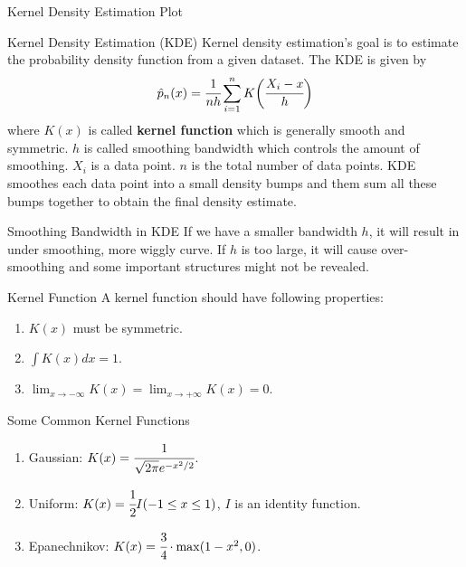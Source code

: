\documentclass[aspectratio=169,xcolor=dvipsnames,svgnames,x11names,fleqn]{beamer}
\begin{document}
\begin{frame}[allowframebreaks]{Kernel Density Estimation Plot}
\begin{facts}{Kernel Density Estimation (KDE)}
Kernel density estimation's goal is to estimate the probability density function from a given dataset. The KDE is given by 
\begin{equation}
    {\hat p}_n(x) = \cfrac{1}{nh}\sum_{i=1}^n K\bigg( \cfrac{X_i - x} {h}\bigg)
\end{equation}
    where $K(x)$ is called \textbf{kernel function} which is generally smooth and symmetric. $h$ is called smoothing bandwidth which controls the amount of smoothing. $X_i$ is a data point. $n$ is the total number of data points. KDE smoothes each data point into a small density bumps and them sum all these bumps together to obtain the final density estimate.
\end{facts}

\begin{gradblock}{Smoothing Bandwidth in KDE}
    If we have a smaller bandwidth $h$, it will result in under smoothing, more wiggly curve. If $h$ is too large, it will cause over-smoothing and some important structures might not be revealed.
\end{gradblock}

    
\begin{gradbox}{Kernel Function}
     A kernel function should have following properties:
     \begin{enumerate}
         \item $K(x)$ must be symmetric.
         \item $\int K(x)dx = 1$.
         \item $\lim_{x\to-\infty} K(x) = \lim_{x\to+\infty} K(x) = 0$.
     \end{enumerate}
\end{gradbox} 

\begin{facts}{Some Common Kernel Functions}
\begin{enumerate}
    \item Gaussian: $K(x)= \cfrac{1}{\sqrt{2\pi} e^{-x^2/2}}$.
    \item Uniform: $K(x) = \cfrac{1}{2}I(-1 \leq x \leq 1)$, \quad $I$ is an identity function.
    \item Epanechnikov: $K(x) = \cfrac{3}{4}\cdot \max(1 - x^2, 0)$.
\end{enumerate}
\end{facts}
\end{frame}
\end{document}

